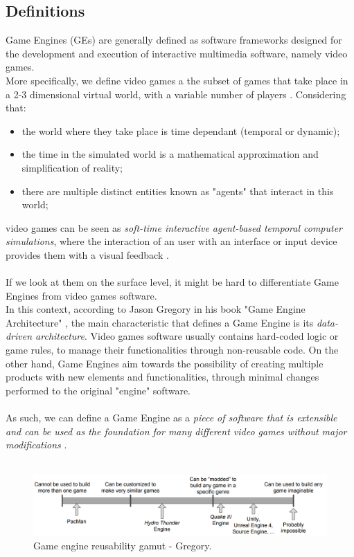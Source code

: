 \subsection{Definitions}
Game Engines (GEs) are generally defined as software frameworks designed for the development and execution of interactive multimedia software, namely video games. \\
More specifically, we define video games a the subset of games that take place in a 2-3 dimensional virtual world, with a variable number of players \cite{womak:distributed-cloud-gaming-pipeline}. Considering that:
\begin{itemize}
	\item the world where they take place is time dependant (temporal or dynamic);
	\item the time in the simulated world is a mathematical approximation and simplification of reality;
	\item there are multiple distinct entities known as "agents" that interact in this world;
\end{itemize}
video games can be seen as \textit{soft-time interactive agent-based temporal computer simulations}, where the interaction of an user with an interface or input device provides them with a visual feedback \cite{site:game-engine-wiki, womak:gregory-game-engine}. \\ \\
If we look at them on the surface level, it might be hard to differentiate Game Engines from video games software. \\
In this context, according to Jason Gregory in his book "Game Engine Architecture" \cite{womak:gregory-game-engine}, the main characteristic that defines a Game Engine is its \textit{data-driven architecture}.
Video games software usually contains hard-coded logic or game rules, to manage their functionalities through non-reusable code. On the other hand, Game Engines aim towards the possibility of creating multiple products with new elements and functionalities, through minimal changes performed to the original "engine" software. \\ \\
As such, we can define a Game Engine as a \textit{piece of software that is extensible and can be used as the foundation for many different video games without major modifications} \cite{womak:gregory-game-engine}. \\ \\
\begin{figure}
	\centering
	\includegraphics[width=1\linewidth]{"immagini/State-of-the-art/Reusability gamut"}
	\caption[Game engine reusability gamut - Gregory]{Game engine reusability gamut - Gregory.}
	\label{fig:reusability-gamut}
\end{figure}

